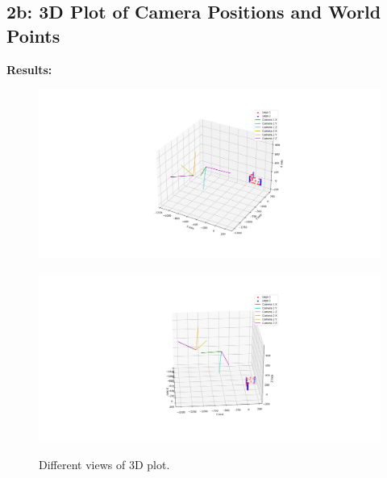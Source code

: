 \documentclass{article}
\begin{document}
\subsection{2b: 3D Plot of Camera Positions and World Points}
\textbf{Results:} \\
\begin{figure}[h]
  \centering
  \begin{minipage}{0.45\textwidth}
      \centering
      \includegraphics[width=\textwidth,  trim=350 0 350 0, clip]{Figure_1.png}
      \label{fig:image1}
  \end{minipage}\hfill
  \begin{minipage}{0.45\textwidth}
      \centering
      \includegraphics[width=\textwidth,  trim=350 0 350 0, clip]{Figure_2.png}
      \label{fig:image2}
  \end{minipage}
  \caption{Different views of 3D plot.}
  \label{fig:side_by_side}
\end{figure}
\end{document}
